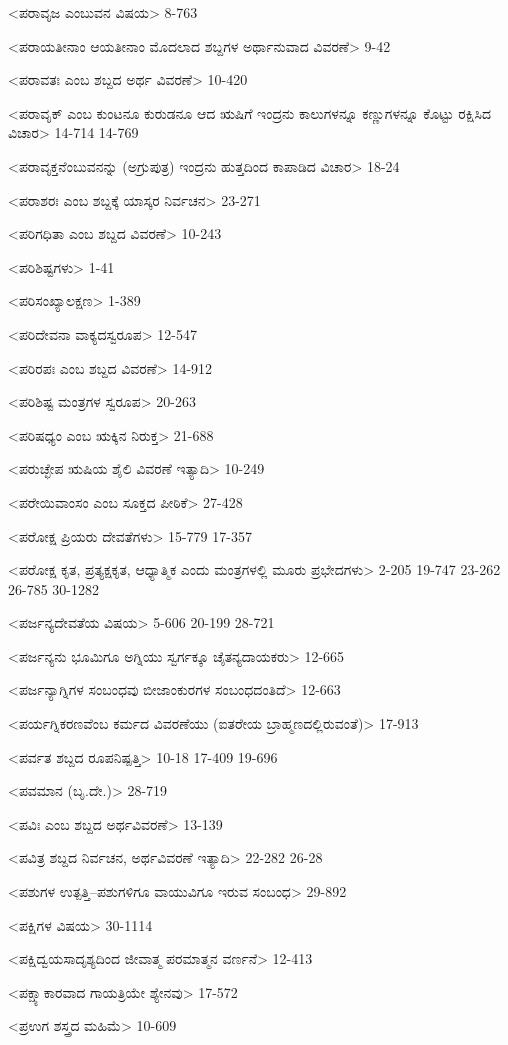 <ಪರಾವೃಜ ಎಂಬುವನ ವಿಷಯ>
8-763

<ಪರಾಯತೀನಾಂ ಆಯತೀನಾಂ ಮೊದಲಾದ ಶಬ್ದಗಳ ಅರ್ಥಾನುವಾದ ವಿವರಣೆ>
9-42

<ಪರಾವತಃ ಎಂಬ ಶಬ್ದದ ಅರ್ಥ ವಿವರಣೆ>
10-420

<ಪರಾವೃಕ್‍ ಎಂಬ ಕುಂಟನೂ ಕುರುಡನೂ ಆದ ಋಷಿಗೆ ಇಂದ್ರನು ಕಾಲುಗಳನ್ನೂ ಕಣ್ಣುಗಳನ್ನೂ ಕೊಟ್ಟು ರಕ್ಷಿಸಿದ ವಿಚಾರ>
14-714
14-769

<ಪರಾವೃಕ್ತನೆಂಬುವನನ್ನು (ಅಗ್ರುಪುತ್ರ) ಇಂದ್ರನು ಹುತ್ತದಿಂದ ಕಾಪಾಡಿದ ವಿಚಾರ>
18-24

<ಪರಾಶರಃ ಎಂಬ ಶಬ್ದಕ್ಕೆ ಯಾಸ್ಕರ ನಿರ್ವಚನ>
23-271

<ಪರಿಗಧಿತಾ ಎಂಬ ಶಬ್ದದ ವಿವರಣೆ>
10-243

<ಪರಿಶಿಷ್ಟಗಳು>
1-41

<ಪರಿಸಂಖ್ಯಾಲಕ್ಷಣ>
1-389

<ಪರಿದೇವನಾ ವಾಕ್ಯದಸ್ವರೂಪ>
12-547

<ಪರಿರಪಃ ಎಂಬ ಶಬ್ದದ ವಿವರಣೆ>
14-912

<ಪರಿಶಿಷ್ಟ ಮಂತ್ರಗಳ ಸ್ವರೂಪ>
20-263

<ಪರಿಷಧ್ಯಂ ಎಂಬ ಋಕ್ಕಿನ ನಿರುಕ್ತ>
21-688

<ಪರುಚ್ಛೇಪ ಋಷಿಯ ಶೈಲಿ ವಿವರಣೆ ಇತ್ಯಾದಿ>
10-249

<ಪರೇಯಿವಾಂಸಂ ಎಂಬ ಸೂಕ್ತದ ಪೀಠಿಕೆ>
27-428

<ಪರೋಕ್ಷ ಪ್ರಿಯರು ದೇವತೆಗಳು>
15-779 
17-357

<ಪರೋಕ್ಷ ಕೃತ, ಪ್ರತ್ಯಕ್ಷಕೃತ, ಆಧ್ಯಾತ್ಮಿಕ ಎಂದು ಮಂತ್ರಗಳಲ್ಲಿ ಮೂರು ಪ್ರಭೇದಗಳು>
2-205
19-747
23-262 
26-785 
30-1282

<ಪರ್ಜನ್ಯದೇವತೆಯ ವಿಷಯ>
5-606 
20-199
28-721

<ಪರ್ಜನ್ಯನು ಭೂಮಿಗೂ ಅಗ್ನಿಯು ಸ್ವರ್ಗಕ್ಕೂ ಚೈತನ್ಯದಾಯಕರು>
12-665

<ಪರ್ಜನ್ಯಾಗ್ನಿಗಳ ಸಂಬಂಧವು ಬೀಜಾಂಕುರಗಳ ಸಂಬಂಧದಂತಿದೆ>
12-663

<ಪರ್ಯಗ್ನಿಕರಣವೆಂಬ ಕರ್ಮದ ವಿವರಣೆಯು (ಐತರೇಯ ಬ್ರಾಹ್ಮಣದಲ್ಲಿರುವಂತೆ)>
17-913

<ಪರ್ವತ ಶಬ್ದದ ರೂಪನಿಷ್ಪತ್ತಿ>
10-18 
17-409
19-696

<ಪವಮಾನ (ಬೃ.ದೇ.)>
28-719

<ಪವಿಃ ಎಂಬ ಶಬ್ದದ ಅರ್ಥವಿವರಣೆ>
13-139

<ಪವಿತ್ರ ಶಬ್ದದ ನಿರ್ವಚನ, ಅರ್ಥವಿವರಣೆ ಇತ್ಯಾದಿ>
22-282 
26-28

<ಪಶುಗಳ ಉತ್ಪತ್ತಿ–ಪಶುಗಳಿಗೂ ವಾಯುವಿಗೂ ಇರುವ ಸಂಬಂಧ>
29-892

<ಪಕ್ಷಿಗಳ ವಿಷಯ>
30-1114

<ಪಕ್ಷಿದ್ವಯಸಾದೃಶ್ಯದಿಂದ ಜೀವಾತ್ಮ ಪರಮಾತ್ಮನ ವರ್ಣನೆ>
12-413

<ಪಕ್ಷ್ಯಾಕಾರವಾದ ಗಾಯತ್ರಿಯೇ ಶ್ಯೇನವು>
17-572

<ಪ್ರಉಗ ಶಸ್ತ್ರದ ಮಹಿಮೆ>
10-609


